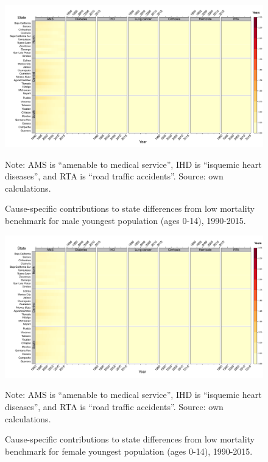 \documentclass[11.5pt]{article}
\begin{document}
{\begin{figure}
\centering
\caption{Cause-specific contributions to state differences from low mortality benchmark for male youngest population (ages 0-14), 1990-2015.}
\label{fig:e0_14_males}
\includegraphics[scale=.3]{Figures/Young_Male_heatmap.pdf}

Note: AMS is ``amenable to medical service'', IHD is ``isquemic heart diseases'', and RTA is ``road traffic accidents''. Source: own calculations.\end{figure}

\begin{figure}
\centering
\caption{Cause-specific contributions to state differences from low mortality benchmark for female youngest population (ages 0-14), 1990-2015.} 
\label{fig:e0_14_females}
\includegraphics[scale=.3]{Figures/Young_Female_heatmap.pdf}

Note: AMS is ``amenable to medical service'', IHD is ``isquemic heart diseases'', and RTA is ``road traffic accidents''. Source: own calculations.
\end{figure}


}
\end{document}
